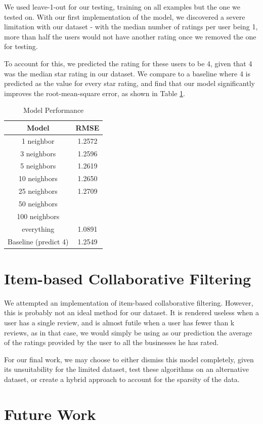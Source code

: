 \documentclass[10pt, letterpaper]{article}
\begin{document}
We used leave-1-out for our testing, training on all examples but the one
we tested on. With our first implementation of the model, we discovered a severe
limitation with our dataset - with the median number of ratings per user
being 1, more than half the users would not have another rating once we
removed the one for testing. 

To account for this, we predicted the rating for these users to be 4,
given that 4 was the median star rating in our dataset. We compare to a
baseline where 4 is predicted as the value for every star rating, and find
that our model significantly improves the root-mean-square error, as shown
in Table \ref{ncf}.

\begin{table}[htb]
\centering
\begin{tabular}{|c|c|}
\hline
{\bf Model} &{\bf RMSE} \tabularnewline \hline
1 neighbor &1.2572 \tabularnewline
3 neighbors &1.2596 \tabularnewline
5 neighbors &1.2619 \tabularnewline
10 neighbors &1.2650 \tabularnewline
25 neighbors &1.2709 \tabularnewline
50 neighbors & \tabularnewline
100 neighbors & \tabularnewline
everything &1.0891 \tabularnewline
Baseline (predict 4) &1.2549
\tabularnewline \hline

\end{tabular}
\caption{ Model Performance }
\label{ncf}
\end{table}

\section{Item-based Collaborative Filtering}
We attempted an implementation of item-based collaborative
filtering. However, this is probably not an ideal method for our
dataset. It is rendered useless when a user has a single review, and is
almost futile when a user has fewer than k reviews, as in that case, we
would simply be using as our prediction the average of the ratings
provided by the user to all the businesses he has rated.

For our final work, we may choose to either dismiss this model completely,
given its unsuitability for the limited dataset, test these algorithms on
an alternative dataset, or create a hybrid approach to account for the
sparsity of the data.

\section{Future Work}
\end{document}
